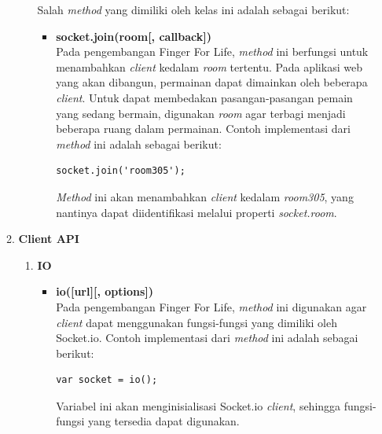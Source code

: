 \begin{enumerate}
\begin{enumerate}
\begin{enumerate}
\begin{itemize}
			\end{itemize}
		
			Salah \textit{method} yang dimiliki oleh kelas ini adalah sebagai berikut:
			\begin{itemize}
				\item \textbf{socket.join(room[, callback])} \\
				Pada pengembangan Finger For Life, \textit{method} ini berfungsi untuk menambahkan \textit{client} kedalam \textit{room} tertentu. Pada aplikasi web yang akan dibangun, permainan dapat dimainkan oleh beberapa \textit{client}. Untuk dapat membedakan pasangan-pasangan pemain yang sedang bermain, digunakan \textit{room} agar terbagi menjadi beberapa ruang dalam permainan. Contoh implementasi dari \textit{method} ini adalah sebagai berikut:
\begin{lstlisting}[caption={Implementasi \textit{method .join()} }]
socket.join('room305');
\end{lstlisting}
				\textit{Method} ini akan menambahkan \textit{client} kedalam \textit{room305}, yang nantinya dapat diidentifikasi melalui properti \textit{socket.room}.
			\end{itemize}
		\end{enumerate}
	
		
		\item \textbf{Client API}
		\begin{enumerate}
			\item \textbf{IO}
			\begin{itemize}
				\item \textbf{io([url][, options])} \\
				Pada pengembangan Finger For Life, \textit{method} ini digunakan agar \textit{client} dapat menggunakan fungsi-fungsi yang dimiliki oleh Socket.io. Contoh implementasi dari \textit{method} ini adalah sebagai berikut:
\begin{lstlisting}[caption={Implementasi proses inisialisasi \textit{socket.io} pada \textit{client}}]
var socket = io();
\end{lstlisting}
				Variabel ini akan menginisialisasi Socket.io \textit{client}, sehingga fungsi-fungsi yang tersedia dapat digunakan.
			\end{itemize}
		

\end{enumerate}
\end{enumerate}
\end{enumerate}
